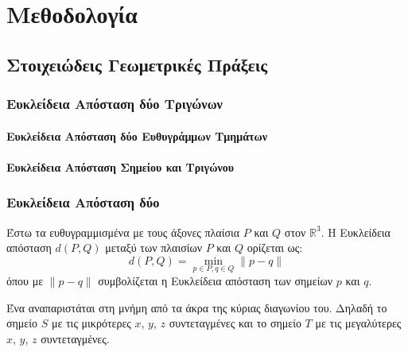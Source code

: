 \chapter{Μεθοδολογία}
\label{ch:methodology}

\section{Στοιχειώδεις Γεωμετρικές Πράξεις}
\subsection{Ευκλείδεια Απόσταση δύο Τριγώνων}
\label{subsec:tria_distance}


\subsubsection{Ευκλείδεια Απόσταση δύο Ευθυγράμμων Τμημάτων}
\subsubsection{Ευκλείδεια Απόσταση Σημείου και Τριγώνου}

\subsection{Ευκλείδεια Απόσταση δύο }
Έστω τα ευθυγραμμισμένα με τους άξονες πλαίσια
$P$ και $Q$ στον $\mathbb{R}^3$.
Η Ευκλείδεια απόσταση $d(P,Q)$ μεταξύ των πλαισίων $P$ και $Q$
ορίζεται ως:
\[ d(P,Q) = \min_{p \in P, q \in Q} \lVert p - q \rVert \]
όπου με $\lVert p - q \rVert$ συμβολίζεται η Ευκλείδεια 
απόσταση των σημείων $p$ και $q$.

Ένα  αναπαριστάται στη μνήμη από τα άκρα της κύριας 
διαγωνίου του.
Δηλαδή το σημείο $S$ με τις μικρότερες $x$, $y$, $z$ συντεταγμένες
και το σημείο $T$ με τις μεγαλύτερες $x$, $y$, $z$ συντεταγμένες.

